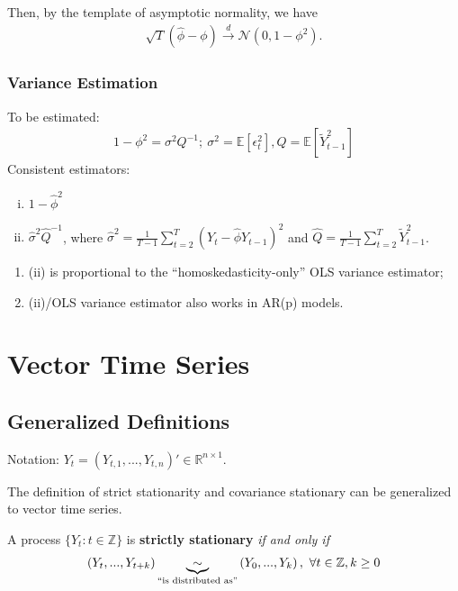 \documentclass[11pt]{elegantbook}
\begin{document}
Then, by the template of asymptotic normality, we have
\begin{equation}
    \begin{aligned}
        \sqrt{T}\left(\hat{\phi}-\phi\right) \stackrel{d}{\longrightarrow} \mathcal{N}\left(0,1-\phi^2\right).
    \end{aligned}
    \nonumber
\end{equation}


\subsection*{Variance Estimation}
To be estimated:
\begin{equation}
    \begin{aligned}
        1-\phi^2=\sigma^2Q^{-1};\ \sigma^2=\mathbb{E}[\epsilon_t^2],Q=\mathbb{E}[\tilde{Y}_{t-1}^2]
    \end{aligned}
    \nonumber
\end{equation}
Consistent estimators:
\begin{enumerate}[(i).]
    \item $1-\hat{\phi}^2$
    \item $\hat{\sigma}^2\hat{Q}^{-1}$, where $\hat{\sigma}^2=\frac{1}{T-1}\sum_{t=2}^T\left(Y_t-\hat{\phi}Y_{t-1}\right)^2$ and $\hat{Q}=\frac{1}{T-1}\sum_{t=2}^T\tilde{Y}_{t-1}^2$.
\end{enumerate}
\begin{remark}
    \begin{enumerate}
        \item (ii) is proportional to the ``homoskedasticity-only'' OLS variance estimator;
        \item (ii)/OLS variance estimator also works in AR(p) models.
    \end{enumerate}
\end{remark}


\chapter{Vector Time Series}
\section{Generalized Definitions}
Notation: $Y_t=\left(Y_{t,1},...,Y_{t,n}\right)'\in \mathbb{R}^{n\times 1}$.

The definition of strict stationarity and covariance stationary can be generalized to vector time series.
\begin{definition}
    A process $\{Y_t:t\in \mathbb{Z}\}$ is \textbf{strictly stationary} \textit{if and only if}
    \begin{equation}
        \begin{aligned}
            \left(Y_t,...,Y_{t+k}\right)\underbrace{\sim}_\textnormal{``is distributed as''} \left(Y_0,...,Y_{k}\right),\ \forall t\in \mathbb{Z},k\geq 0
        \end{aligned}
        \nonumber
    \end{equation}
\end{definition}
\end{document}
